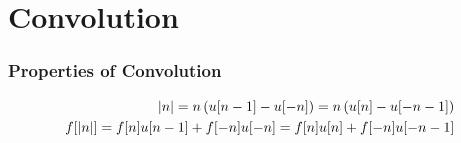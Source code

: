 \documentclass[10pt,UTF8]{article}
\newenvironment{definition box}
{\begin{tcolorbox}[colback=blue!5!white,colframe=blue!75!black,parbox=false,before upper=\par,before lower=\par]}
{\end{tcolorbox}}
\newenvironment{theorem box}
{\begin{tcolorbox}[colback=yellow!5!white,colframe=yellow!75!black,parbox=false,before upper=\par,before lower=\par]}
{\end{tcolorbox}}
\theoremstyle{definition}
\newtheorem{definition inner}{Definition}[section]
\theoremstyle{plain}
\newtheorem{theorem inner}{Theorem}[section]
\theoremstyle{definition}
\newtheorem*{proof inner}{\textit{Proof}}
\theoremstyle{remark}
\begin{document}
\part*{Convolution}

\section{Properties of Convolution}

\begin{align*}
    \abs{n} = n \left(u[n-1] - u[-n]\right) = n \left(u[n] - u[-n-1]\right) \\
    f[\abs{n}] = f[n] u[n-1] + f[-n] u[-n] = f[n] u[n] + f[-n] u[-n-1]
\end{align*}
\end{document}
